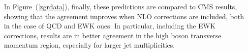 \documentclass[11pt]{cernrep} \usepackage{graphicx,epsfig} 
\begin{document}
In Figure~(\ref{zgrdata}), finally, these predictions are compared to CMS results, showing that the agreement improves
when NLO corrections are included, both in the case of QCD and EWK ones. In particular, including the EWK corrections,
results are in better agreement in the high boson transverse momentum region, especially for larger jet multiplicities. 


\end{document}
